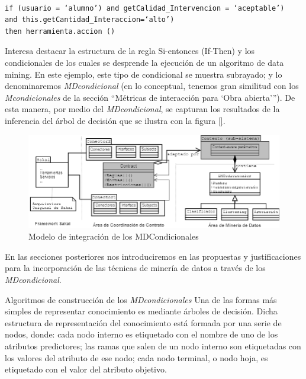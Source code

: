 \begin{verbatim}

if (usuario = ‘alumno’) and getCalidad_Intervencion = ‘aceptable’)
and this.getCantidad_Interaccion=‘alto’)
then herramienta.accion ()

\end{verbatim} 

Interesa destacar la estructura de la regla Si-entonces (If-Then) y los condicionales
de los cuales se desprende la ejecución de un algoritmo de data mining.
En este ejemplo, este tipo de condicional se muestra subrayado; y lo denominaremos
\textit{MDcondicional} (en lo conceptual, tenemos gran similitud con los
\textit{Mcondicionales} de la sección “Métricas de interacción para ‘Obra
abierta’”). De esta manera, por medio del \textit{MDcondicional}, se capturan
los resultados de la inferencia del árbol de decisión que se ilustra con la
figura \ref{}.

\begin{figure}
\begin{center}
 \includegraphics[width=6 in,totalheight=2 in]{Ch4/f3.png}
\end{center}
\caption{Modelo de integración de los MDCondicionales}
\end{figure}


En las secciones posteriores nos introduciremos en las propuestas y justificaciones
para la incorporación de las técnicas de minería de datos a través
de los \textit{MDcondicional}.

Algoritmos de construcción de los \textit{MDcondicionales} Una de las formas más
simples
de representar conocimiento es mediante árboles de decisión. Dicha estructura de
representación del conocimiento está formada por una serie de nodos, donde: cada
nodo interno es etiquetado con el nombre de uno de los atributos predictores;
las ramas que salen de un nodo interno son etiquetadas con los valores del
atributo de ese nodo; cada nodo terminal, o nodo hoja, es etiquetado con el
valor del atributo objetivo.

